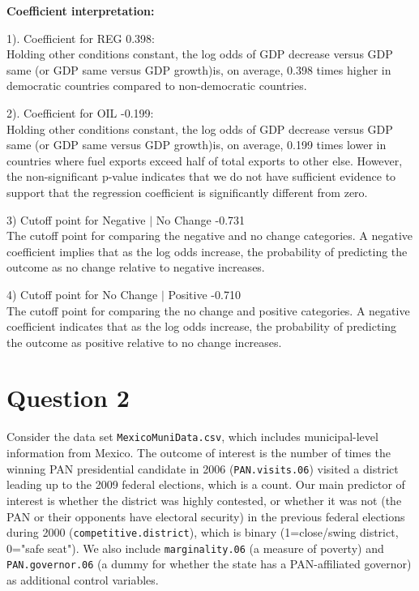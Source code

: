 \documentclass[12pt,a4paper]{article}
\begin{document}
\begin{enumerate}
	\noindent \textbf{Coefficient interpretation:}

\vspace{.25cm}

1). Coefficient for REG 0.398: 
\\Holding other conditions constant, the log odds of GDP decrease versus GDP  same (or GDP same versus GDP growth)is, on average, 0.398 times higher in democratic countries compared to non-democratic countries.

2). Coefficient for OIL -0.199: 
\\Holding other conditions constant, the log odds of GDP decrease versus GDP  same (or GDP same versus GDP growth)is, on average, 0.199 times lower in countries where fuel exports exceed half of total exports to other else. However, the non-significant p-value indicates that we do not have sufficient evidence to support that the regression coefficient is significantly different from zero.  

3) Cutoff point for Negative $|$ No Change -0.731
\\The cutoff point for comparing the negative and no change categories. A negative coefficient implies that as the log odds increase, the probability of predicting the outcome as no change relative to negative increases.

4) Cutoff point for No Change $|$ Positive -0.710
\\The cutoff point for comparing the no change and positive categories. A negative coefficient indicates that as the log odds increase, the probability of predicting the outcome as positive relative to no change increases.

	
\end{enumerate}

\newpage
\section*{Question 2} 
\vspace{.25cm}

\noindent Consider the data set \texttt{MexicoMuniData.csv}, which includes municipal-level information from Mexico. The outcome of interest is the number of times the winning PAN presidential candidate in 2006 (\texttt{PAN.visits.06}) visited a district leading up to the 2009 federal elections, which is a count. Our main predictor of interest is whether the district was highly contested, or whether it was not (the PAN or their opponents have electoral security) in the previous federal elections during 2000 (\texttt{competitive.district}), which is binary (1=close/swing district, 0="safe seat"). We also include \texttt{marginality.06} (a measure of poverty) and \texttt{PAN.governor.06} (a dummy for whether the state has a PAN-affiliated governor) as additional control variables. 
\end{document}
